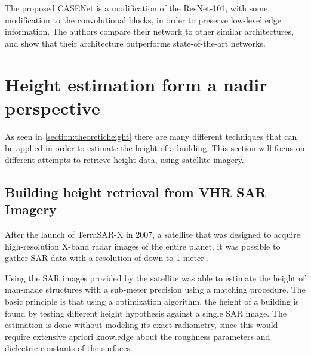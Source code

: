 The proposed CASENet is a modification of the ResNet-101, with some modification to the convolutional blocks, in order to preserve low-level edge information. The authors compare their network to other similar architectures, and show that their architecture outperforms state-of-the-art networks.

\section{Height estimation form a nadir perspective}
As seen in \autoref{section:theoreticheight} there are many different techniques that can be applied in order to estimate the height of a building. This section will focus on different attempts to retrieve height data, using satellite imagery.

\subsection{Building height retrieval from VHR SAR Imagery}
After the launch of TerraSAR-X in 2007, a satellite that was designed to acquire high-resolution X-band radar images of the entire planet, it was possible to gather SAR data with a resolution of down to 1 meter \citep{Airbus2017}.

Using the SAR images provided by the satellite \cite{Brunner2008} was able to estimate the height of man-made structures with a sub-meter precision using a matching procedure. The basic principle is that using a optimization algorithm, the height of a building is found by testing different height hypothesis against a single SAR image. The estimation is done without modeling its exact radiometry, since this would require extensive apriori knowledge about the roughness parameters and dielectric constants of the surfaces.

